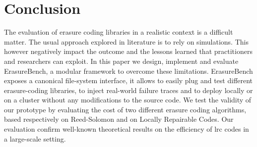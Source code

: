 \section{Conclusion}
\label{sec:conclusion}
The evaluation of erasure coding libraries in a realistic context is a difficult matter.
The usual approach explored in literature is to rely on simulations.
This however negatively impact the outcome and the lessons learned that practitioners and researchers can exploit. 
In this paper we design, implement and evaluate ErasureBench, a modular framework to overcome these limitations.
ErasureBench exposes a canonical file-system interface, it allows to easily plug and test different erasure-coding libraries, to inject real-world failure traces and to deploy locally or on a cluster without any modifications to the source code.
We test the validity of our prototype by evaluating the cost of two different erasure coding algorithms, based respectively on Reed-Solomon and on Locally Repairable Codes.
Our evaluation confirm well-known theoretical results on the efficiency of \ac{lrc} codes in a large-scale setting.  

